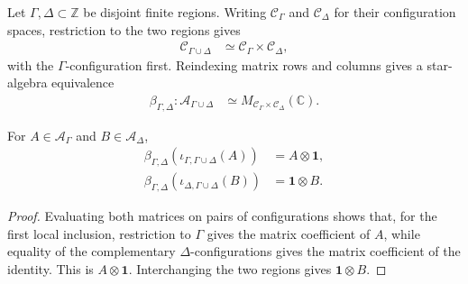 \begin{definition}
    \label{def:qca_bipartite_local_algebra_coordinates}
    \leanok
    Let $\Gamma,\Delta\subset\mathbb Z$ be disjoint finite regions.  Writing
    $\mathcal C_\Gamma$ and $\mathcal C_\Delta$ for their configuration
    spaces, restriction to the two regions gives
    \begin{align}
        \mathcal C_{\Gamma\cup\Delta}
         & \simeq \mathcal C_\Gamma\times\mathcal C_\Delta,
    \end{align}
    with the $\Gamma$-configuration first.  Reindexing matrix rows and
    columns gives a star-algebra equivalence
    \begin{align}
        \beta_{\Gamma,\Delta}\colon
        \mathcal A_{\Gamma\cup\Delta}
         & \simeq
        M_{\mathcal C_\Gamma\times\mathcal C_\Delta}(\mathbb C).
    \end{align}
\end{definition}

\begin{lemma}
    \label{thm:qca_bipartite_local_algebra_inclusions}
    \leanok
    For $A\in\mathcal A_\Gamma$ and $B\in\mathcal A_\Delta$,
    \begin{align}
        \beta_{\Gamma,\Delta}(\iota_{\Gamma,\Gamma\cup\Delta}(A))
         & =A\otimes\mathbf 1,  \\
        \beta_{\Gamma,\Delta}(\iota_{\Delta,\Gamma\cup\Delta}(B))
         & =\mathbf 1\otimes B.
    \end{align}
\end{lemma}

\begin{proof}\leanok
    Evaluating both matrices on pairs of configurations shows that, for the first local
    inclusion, restriction to $\Gamma$ gives the matrix coefficient of $A$,
    while equality of the complementary $\Delta$-configurations gives the
    matrix coefficient of the identity.  This is $A\otimes\mathbf 1$.
    Interchanging the two regions gives $\mathbf 1\otimes B$.
\end{proof}

